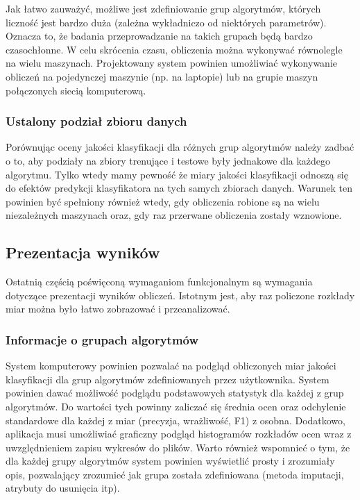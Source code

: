 \documentclass[../thesis.tex]{subfiles}
\begin{document}
Jak łatwo zauważyć, możliwe jest zdefiniowanie grup algorytmów, których liczność jest bardzo duża (zależna wykładniczo od niektórych parametrów). Oznacza to, że badania przeprowadzanie na takich grupach będą bardzo czasochłonne. W celu skrócenia czasu, obliczenia można wykonywać równolegle na wielu maszynach. Projektowany system powinien umożliwiać wykonywanie obliczeń na pojedynczej maszynie (np. na laptopie) lub na grupie maszyn połączonych siecią komputerową.

\subsubsection{Ustalony podział zbioru danych}

Porównując oceny jakości klasyfikacji dla różnych grup algorytmów należy zadbać o to, aby podziały na zbiory trenujące i testowe były jednakowe dla każdego algorytmu. Tylko wtedy mamy pewność że miary jakości klasyfikacji odnoszą się do efektów predykcji klasyfikatora na tych samych zbiorach danych. Warunek ten powinien być spełniony również wtedy, gdy obliczenia robione są na wielu niezależnych maszynach oraz, gdy raz przerwane obliczenia zostały wznowione.

\subsection{Prezentacja wyników}

Ostatnią częścią poświęconą wymaganiom funkcjonalnym są wymagania dotyczące prezentacji wyników obliczeń. Istotnym jest, aby raz policzone rozkłady miar można było łatwo zobrazować i przeanalizować.

\subsubsection{Informacje o grupach algorytmów}

System komputerowy powinien pozwalać na podgląd obliczonych miar jakości klasyfikacji dla grup algorytmów zdefiniowanych przez użytkownika. System powinien dawać możliwość podglądu podstawowych statystyk dla każdej z grup algorytmów. Do wartości tych powinny zaliczać się średnia ocen oraz odchylenie standardowe dla każdej z miar (precyzja, wrażliwość, F1) z osobna. Dodatkowo, aplikacja musi umożliwiać graficzny podgląd histogramów rozkładów ocen wraz z uwzględnieniem zapisu wykresów do plików. Warto również wspomnieć o tym, że dla każdej grupy algorytmów system powinien wyświetlić prosty i zrozumiały opis, pozwalający zrozumieć jak grupa została zdefiniowana (metoda imputacji, atrybuty do usunięcia itp).
\end{document}
